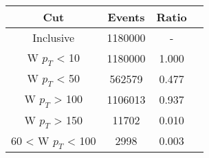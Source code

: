 \begin{tabular}{|c||c|c|c|}
\hline
Cut & Events & Ratio\\\hline
Inclusive & 1180000 & - \\
W $p_{T}$ < 10 & 1180000 & 1.000 \\
W $p_{T}$ < 50 & 562579 & 0.477 \\
W $p_{T}$ > 100 & 1106013 & 0.937 \\
W $p_{T}$ > 150 & 11702 & 0.010 \\
60 < W $p_{T}$ < 100 & 2998 & 0.003 \\
\hline
\end{tabular}
